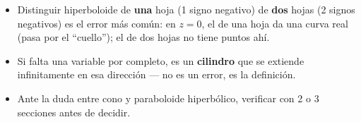 \documentclass[11pt,a4paper]{article}
\begin{document}
\begin{atencion}
\begin{itemize}
    \item Distinguir hiperboloide de \textbf{una} hoja (1 signo negativo) de \textbf{dos}
    hojas (2 signos negativos) es el error más común: en $z=0$, el de una hoja da una
    curva real (pasa por el ``cuello''); el de dos hojas no tiene puntos ahí.
    \item Si falta una variable por completo, es un \textbf{cilindro} que se extiende
    infinitamente en esa dirección — no es un error, es la definición.
    \item Ante la duda entre cono y paraboloide hiperbólico, verificar con 2 o 3
    secciones antes de decidir.
\end{itemize}
\end{atencion}
\end{document}
